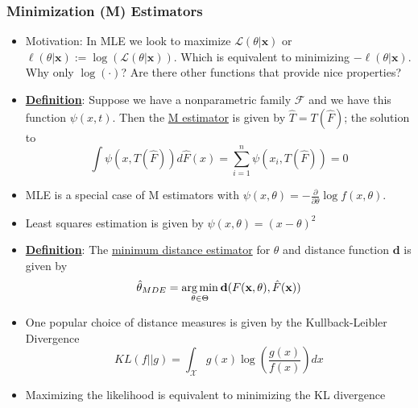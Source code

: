 \documentclass{article}
\newcommand{\x}{{\textbf{x}}}
\begin{document}
\subsubsection{Minimization (M) Estimators}
\begin{itemize}
\item Motivation: In MLE we look to maximize $\mathcal{L}(\theta|\x)$ or $\ell(\theta|\x) := \log(\mathcal{L}(\theta|\x))$. Which is equivalent to minimizing $-\ell(\theta|\x)$. Why only $\log(\cdot)$? Are there other functions that provide nice properties? 
\item \underline{\textbf{Definition}}: Suppose we have a nonparametric family $\mathcal{F}$ and we have this function $\psi(x,t)$. Then the \underline{M estimator} is given by $\hat{T} = T(\hat{F})$; the solution to $$\int \psi(x,T(\hat{F}))d\hat{F}(x) = \sum_{i=1}^n\psi(x_i, T(\hat{F})) = 0$$
\item MLE is a special case of M estimators with $\psi(x,\theta) = -\frac{\partial}{\partial\theta}\log f(x,\theta)$. 
\item Least squares estimation is given by $\psi(x,\theta) = (x - \theta)^2$
\item \underline{\textbf{Definition}}: The \underline{minimum distance estimator} for $\theta$ and distance function $\mathbf{d}$ is given by $$\hat{\theta}_{MDE} = \underset{\theta\in \Theta}{\arg\min}\hspace{.2em}\mathbf{d}(F(\x,\theta),\hat{F}(\x))$$
\item One popular choice of distance measures is given by the Kullback-Leibler Divergence $$KL(f||g) = \int_{\mathcal{X}} g(x)\log\left(\frac{g(x)}{f(x)}\right)dx$$
\item Maximizing the likelihood is equivalent to minimizing the KL divergence 
\end{itemize}
\end{document}

